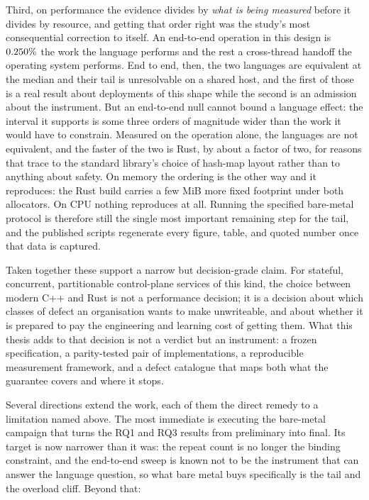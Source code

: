 \documentclass[english,twoside,openright,a4paper,censored,csm,software-track-2020]{HYthesisML}
\begin{document}
Third, on performance the evidence divides by \emph{what is being measured} before it divides
by resource, and getting that order right was the study's most consequential correction to
itself. An end-to-end operation in this design is $0.250\%$ the work the language
performs and the rest a cross-thread handoff the operating system performs. End to end, then,
the two languages are equivalent at the median and their tail is unresolvable on a shared host,
and the first of those is a real result about deployments of this shape while the second is an
admission about the instrument. But an end-to-end null cannot bound a language effect: the
interval it supports is some three orders of magnitude wider than the work it would have to
constrain. Measured on the operation alone, the languages are not equivalent, and the faster of
the two is Rust, by about a factor of two, for reasons that trace to the standard library's
choice of hash-map layout rather than to anything about safety. On memory the ordering is the
other way and it reproduces: the Rust build carries a few MiB more fixed footprint under both
allocators. On CPU nothing reproduces at all. Running the specified bare-metal protocol is
therefore still the single most important remaining step for the tail, and the published
scripts regenerate every figure, table, and quoted number once that data is captured.

Taken together these support a narrow but decision-grade claim. For stateful, concurrent,
partitionable control-plane services of this kind, the choice between modern C++ and Rust is
not a performance decision; it is a decision about which classes of defect an organisation
wants to make unwriteable, and about whether it is prepared to pay the engineering and
learning cost of getting them. What this thesis adds to that decision is not a verdict but an
instrument: a frozen specification, a parity-tested pair of implementations, a reproducible
measurement framework, and a defect catalogue that maps both what the guarantee covers and
where it stops.

Several directions extend the work, each of them the direct remedy to a limitation named above.
The most immediate is executing the bare-metal campaign that turns the RQ1 and RQ3 results from
preliminary into final. Its target is now narrower than it was: the repeat count is no longer
the binding constraint, and the end-to-end sweep is known not to be the instrument that can
answer the language question, so what bare metal buys specifically is the tail and the overload
cliff. Beyond that:
\end{document}
